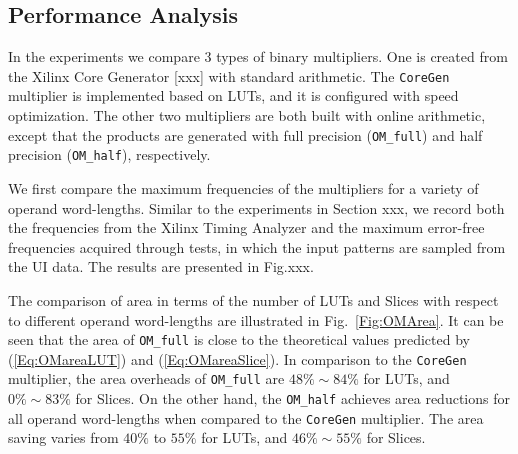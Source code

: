 \documentclass[conference]{IEEEtran}
\begin{document}
\subsection{Performance Analysis}
In the experiments we compare 3 types of binary multipliers. One is created from the Xilinx Core Generator [xxx] with standard arithmetic. The \texttt{CoreGen} multiplier is implemented based on LUTs, and it is configured with speed optimization. The other two multipliers are both built with online arithmetic, except that the products are generated with full precision (\texttt{OM\_full}) and half precision (\texttt{OM\_half}), respectively.

We first compare the maximum frequencies of the multipliers for a variety of operand word-lengths. Similar to the experiments in Section xxx, we record both the frequencies from the Xilinx Timing Analyzer and the maximum error-free frequencies acquired through tests, in which the input patterns are sampled from the UI data. The results are presented in Fig.xxx.



The comparison of area in terms of the number of LUTs and Slices with respect to different operand word-lengths are illustrated in Fig.~\ref{Fig:OMArea}. It can be seen that the area of \texttt{OM\_full} is close to the theoretical values predicted by (\ref{Eq:OMareaLUT}) and (\ref{Eq:OMareaSlice}). In comparison to the \texttt{CoreGen} multiplier, the area overheads of \texttt{OM\_full} are $48\%\sim84\%$ for LUTs, and $0\%\sim83\%$ for Slices. On the other hand, the \texttt{OM\_half} achieves area reductions for all operand word-lengths when compared to the \texttt{CoreGen} multiplier. The area saving varies from $40\%$ to $55\%$ for LUTs, and $46\%\sim55\%$ for Slices.
\end{document}
